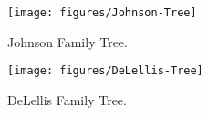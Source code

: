 \documentclass[12pt]{book}
\begin{document}
\begin{figure}
    \centering
    \texttt{[image: figures/Johnson-Tree]}
    \caption{Johnson Family Tree.}
    \label{fig:johnson-tree}
\end{figure}

\begin{figure}
    \centering
    \texttt{[image: figures/DeLellis-Tree]}
    \caption{DeLellis Family Tree.}
    \label{fig:delellis-tree}
\end{figure}


\backmatter
\printindex
\end{document}
